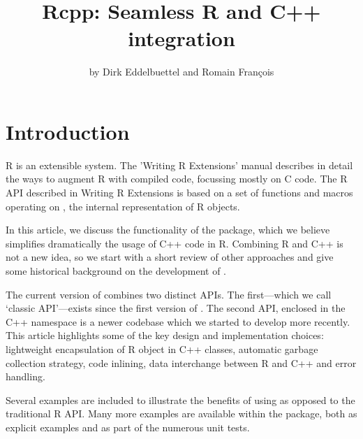 
\title{Rcpp: Seamless R and C++ integration}
\author{by Dirk Eddelbuettel and Romain Fran\c{c}ois}

\maketitle


\section{Introduction} 

R is an extensible system. The 'Writing R Extensions' manual \citep{R:exts}
describes in detail the ways to augment R with compiled code,
focussing mostly on C code. The R API described in Writing R Extensions is
based on a set of functions and macros operating on , the internal
representation of R objects.

In this article, we discuss the functionality of the 
package, which we believe simplifies dramatically the usage of C++ code
in R. Combining R and C++ is not a new idea, so we start with
a short review of other approaches and give some historical
background on the development of .

The current version of  combines two distinct
APIs. The first---which we call `classic  API'---exists since 
the first version of . The second API, enclosed in the 
 C++ namespace is a newer codebase which we started to develop
more recently. This article 
highlights some of the key design and implementation choices: 
lightweight encapsulation of R object in C++ classes, automatic
garbage collection strategy, code inlining, data interchange between 
R and C++ and error handling. 

Several examples are included to illustrate the benefits of using 
as opposed to the traditional R API. Many more examples are available within
the package, both as explicit examples and as part of the numerous unit tests.

